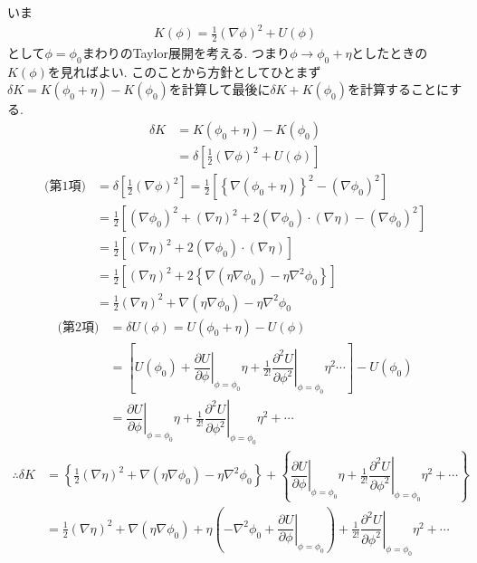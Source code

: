 \documentclass[dvipdfmx,11pt,a4paper,oneside,openany]{jsbook}
\begin{document}
いま
\begin{align*}
    K(\phi)=\frac{1}{2}(\nabla \phi)^2+U(\phi)
\end{align*}
として$\phi=\phi_0$まわりのTaylor展開を考える. つまり$\phi\rightarrow \phi_0+\eta$としたときの$K(\phi)$を見ればよい. このことから方針としてひとまず$\delta K=K(\phi_0+\eta)-K(\phi_0)$を計算して最後に$\delta K+K(\phi_0)$を計算することにする.
\begin{align*}
    \delta K & =K(\phi_0+\eta)-K(\phi_0)                             \\
             & =\delta\left[\frac{1}{2}(\nabla\phi)^2+U(\phi)\right]
\end{align*}
\begin{align*}
    \text{(第1項)} & =\delta\left[\frac{1}{2}(\nabla\phi)^2\right]=\frac{1}{2}\left[\left\{\nabla(\phi_0+\eta)\right\}^2-(\nabla\phi_0)^2\right] \\
                   & =\frac{1}{2}\left[(\nabla\phi_0)^2+(\nabla\eta)^2+2(\nabla\phi_0)\cdot(\nabla\eta)-(\nabla\phi_0)^2\right]                  \\
                   & =\frac{1}{2}\left[(\nabla\eta)^2+2(\nabla\phi_0)\cdot(\nabla\eta)\right]                                                    \\
                   & =\frac{1}{2}\left[(\nabla\eta)^2+2\left\{\nabla(\eta\nabla\phi_0)-\eta\nabla^2\phi_0\right\}\right]                         \\
                   & =\frac{1}{2}(\nabla\eta)^2+\nabla(\eta\nabla\phi_0)-\eta\nabla^2\phi_0
\end{align*}
\begin{align*}
    \text{(第2項)} & =\delta U(\phi)=U(\phi_0+\eta)-U(\phi)                                                                                                                                                      \\
                   & =\left[U(\phi_0)+\left.\dfrac{\partial U}{\partial \phi}\right|_{\phi=\phi_0}\eta+\frac{1}{2!}\left.\dfrac{\partial^2 U}{\partial \phi^2}\right|_{\phi=\phi_0}\eta^2\cdots\right]-U(\phi_0) \\
                   & =\left.\dfrac{\partial U}{\partial \phi}\right|_{\phi=\phi_0}\eta+\frac{1}{2!}\left.\dfrac{\partial^2 U}{\partial \phi^2}\right|_{\phi=\phi_0}\eta^2+\cdots
\end{align*}
\begin{align*}
    \therefore \delta K & =\left\{\frac{1}{2}(\nabla\eta)^2+\nabla(\eta\nabla\phi_0)-\eta\nabla^2\phi_0\right\}+\left\{\left.\dfrac{\partial U}{\partial \phi}\right|_{\phi=\phi_0}\eta+\frac{1}{2!}\left.\dfrac{\partial^2 U}{\partial \phi^2}\right|_{\phi=\phi_0}\eta^2+\cdots\right\} \\
                        & =\frac{1}{2}(\nabla\eta)^2+\nabla(\eta\nabla\phi_0)+\eta\left(-\nabla^2\phi_0+\left.\dfrac{\partial U}{\partial \phi}\right|_{\phi=\phi_0}\right)+\frac{1}{2!}\left.\dfrac{\partial^2 U}{\partial \phi^2}\right|_{\phi=\phi_0}\eta^2+\cdots
\end{align*}
\end{document}

